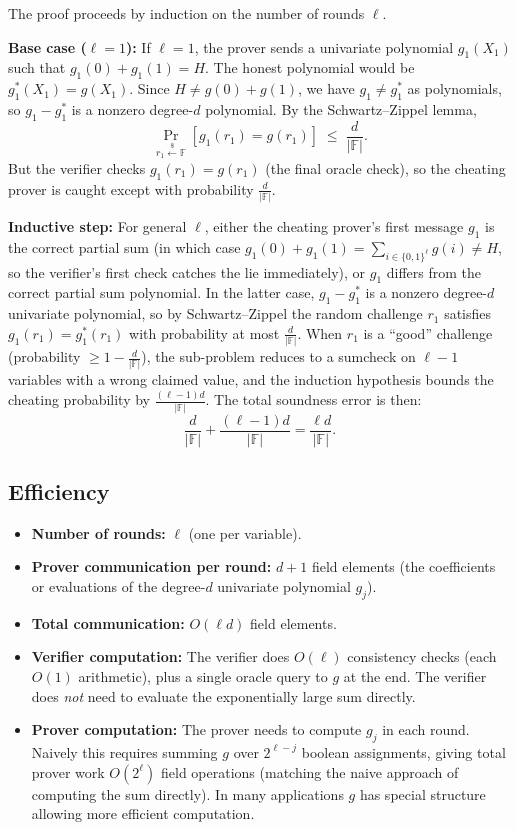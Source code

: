 \documentclass[11pt]{article}
\theoremstyle{plain}
\theoremstyle{definition}
\newcommand{\F}{\mathbb{F}}
\begin{document}
The proof proceeds by induction on the number of rounds $\ell$.

\textbf{Base case ($\ell = 1$):} If $\ell = 1$, the prover sends a univariate polynomial
$g_1(X_1)$ such that $g_1(0) + g_1(1) = H$. The honest polynomial would be $g_1^*(X_1) = g(X_1)$.
Since $H \neq g(0) + g(1)$, we have $g_1 \neq g_1^*$ as polynomials, so $g_1 - g_1^*$ is a
nonzero degree-$d$ polynomial. By the Schwartz--Zippel lemma,
\[
  \Pr_{r_1 \xleftarrow{\$} \F}\!\left[g_1(r_1) = g(r_1)\right] \;\leq\; \frac{d}{|\F|}.
\]
But the verifier checks $g_1(r_1) = g(r_1)$ (the final oracle check), so the cheating prover is
caught except with probability $\frac{d}{|\F|}$.

\textbf{Inductive step:} For general $\ell$, either the cheating prover's first message $g_1$ is
the correct partial sum (in which case $g_1(0) + g_1(1) = \sum_{i \in \{0,1\}^\ell} g(i) \neq H$,
so the verifier's first check catches the lie immediately), or $g_1$ differs from the correct
partial sum polynomial. In the latter case, $g_1 - g_1^*$ is a nonzero degree-$d$ univariate
polynomial, so by Schwartz--Zippel the random challenge $r_1$ satisfies $g_1(r_1) = g_1^*(r_1)$
with probability at most $\frac{d}{|\F|}$. When $r_1$ is a ``good'' challenge (probability $\geq
1 - \frac{d}{|\F|}$), the sub-problem reduces to a sumcheck on $\ell-1$ variables with a wrong
claimed value, and the induction hypothesis bounds the cheating probability by $\frac{(\ell-1)d}{|\F|}$.
The total soundness error is then:
\[
  \frac{d}{|\F|} + \frac{(\ell-1)d}{|\F|} = \frac{\ell d}{|\F|}.
\]

\subsection{Efficiency}

\begin{itemize}
  \item \textbf{Number of rounds:} $\ell$ (one per variable).
  \item \textbf{Prover communication per round:} $d + 1$ field elements (the coefficients or
        evaluations of the degree-$d$ univariate polynomial $g_j$).
  \item \textbf{Total communication:} $O(\ell d)$ field elements.
  \item \textbf{Verifier computation:} The verifier does $O(\ell)$ consistency checks (each $O(1)$
        arithmetic), plus a single oracle query to $g$ at the end. The verifier does \emph{not}
        need to evaluate the exponentially large sum directly.
  \item \textbf{Prover computation:} The prover needs to compute $g_j$ in each round. Naively this
        requires summing $g$ over $2^{\ell - j}$ boolean assignments, giving total prover work
        $O(2^\ell)$ field operations (matching the naive approach of computing the sum directly).
        In many applications $g$ has special structure allowing more efficient computation.
\end{itemize}
\end{document}
